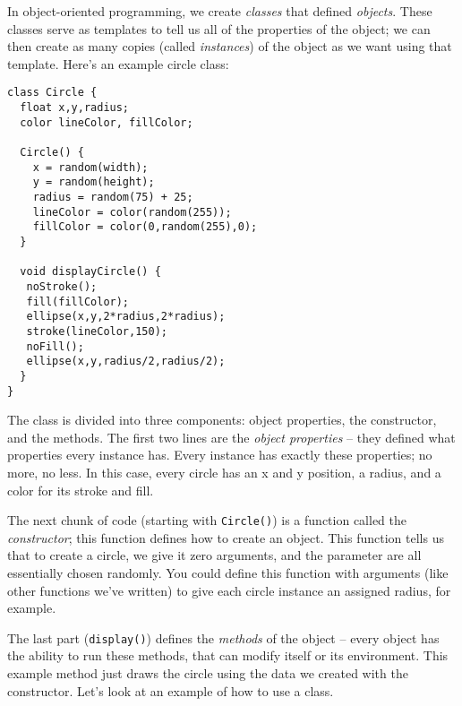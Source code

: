 In object-oriented programming, we create \emph{classes} that defined \emph{objects}.  These classes serve as templates to tell us all of the properties of the object; we can then create as many copies (called \emph{instances}) of the object as we want using that template.  Here's an example circle class:

\begin{verbatim}
class Circle {
  float x,y,radius;
  color lineColor, fillColor;
  
  Circle() {
    x = random(width);
    y = random(height);
    radius = random(75) + 25;
    lineColor = color(random(255));
    fillColor = color(0,random(255),0);
  }
  
  void displayCircle() {
   noStroke();
   fill(fillColor);
   ellipse(x,y,2*radius,2*radius);
   stroke(lineColor,150);
   noFill();
   ellipse(x,y,radius/2,radius/2); 
  }  
}
\end{verbatim}

The class is divided into three components: object properties, the constructor, and the methods.  The first two lines are the \emph{object properties} -- they defined what properties every instance has.  Every instance has exactly these properties; no more, no less.  In this case, every circle has an x and y position, a radius, and a color for its stroke and fill.

The next chunk of code (starting with \texttt{Circle()}) is a function called the \emph{constructor}; this function defines how to create an object.  This function tells us that to create a circle, we give it zero arguments, and the parameter are all essentially chosen randomly.  You could define this function with arguments (like other functions we've written) to give each circle instance an assigned radius, for example.

The last part (\texttt{display()}) defines the \emph{methods} of the object -- every object has the ability to run these methods, that can modify itself or its environment.  This example method just draws the circle using the data we created with the constructor.  Let's look at an example of how to use a class.

